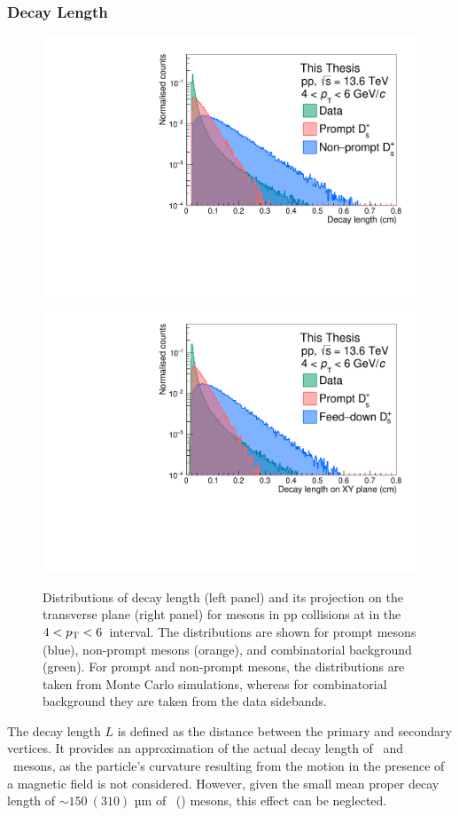 \subsubsection{Decay Length}
\begin{figure}
    \centering
    \includegraphics[width=0.48\linewidth]{Figures/Chapter 4/DecayLength.pdf}
    \includegraphics[width=0.48\linewidth]{Figures/Chapter 4/DecayLengthXY.pdf}
    \caption{Distributions of decay length (left panel) and its projection on the transverse plane (right panel)  for \ds mesons in pp collisions at \thirteen in the $4 < p_\mathrm{T} < 6$~\gevc interval. The distributions
    are shown for prompt \ds mesons (blue), non-prompt \ds mesons (orange), and combinatorial background
    (green). For prompt and non-prompt \ds mesons, the distributions are taken from Monte Carlo
    simulations, whereas for combinatorial background they are taken from the data sidebands.}
    \label{fig:DecayLength}
\end{figure}
The decay length $L$ is defined as the distance between the primary and secondary vertices. It provides an approximation of the actual decay length of \ds\ and \dpl\ mesons, as the particle's curvature resulting from the motion in the presence of a magnetic field is not considered. However, given the small mean proper decay length of $\sim 150~(310)$ µm of \ds\ (\dpl) mesons, this effect can be neglected. 

